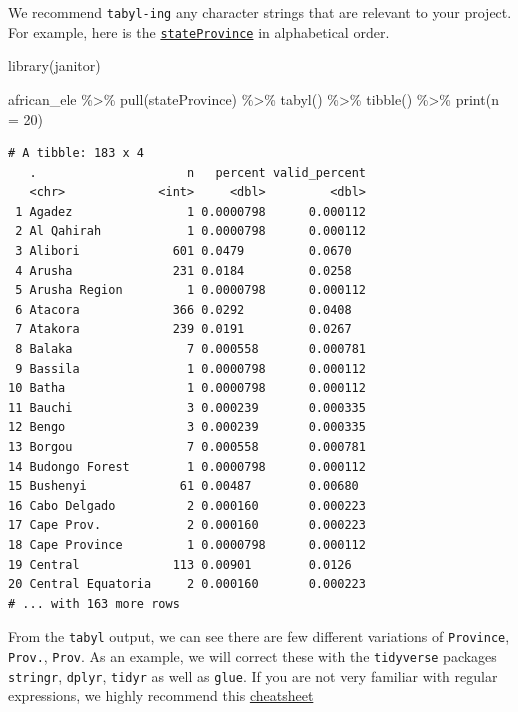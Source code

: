 \documentclass[
  letterpaper,
  DIV=11,
  numbers=noendperiod,
  oneside]{scrreprt}
\newenvironment{Shaded}{\begin{snugshade}}{\end{snugshade}}
\newcommand{\AttributeTok}[1]{\textcolor[rgb]{0.40,0.45,0.13}{#1}}
\newcommand{\DecValTok}[1]{\textcolor[rgb]{0.68,0.00,0.00}{#1}}
\newcommand{\FunctionTok}[1]{\textcolor[rgb]{0.28,0.35,0.67}{#1}}
\newcommand{\NormalTok}[1]{\textcolor[rgb]{0.00,0.23,0.31}{#1}}
\newcommand{\SpecialCharTok}[1]{\textcolor[rgb]{0.37,0.37,0.37}{#1}}
\begin{document}
We recommend \texttt{tabyl-ing} any character strings that are relevant
to your project. For example, here is the
\href{https://dwc.tdwg.org/terms/\#dwc:stateProvince}{\texttt{stateProvince}}
in alphabetical order.

\begin{Shaded}
\begin{Highlighting}[]
\FunctionTok{library}\NormalTok{(janitor)}

\NormalTok{african\_ele }\SpecialCharTok{\%\textgreater{}\%}
  \FunctionTok{pull}\NormalTok{(stateProvince) }\SpecialCharTok{\%\textgreater{}\%} 
  \FunctionTok{tabyl}\NormalTok{() }\SpecialCharTok{\%\textgreater{}\%} 
  \FunctionTok{tibble}\NormalTok{() }\SpecialCharTok{\%\textgreater{}\%} 
  \FunctionTok{print}\NormalTok{(}\AttributeTok{n =} \DecValTok{20}\NormalTok{)}
\end{Highlighting}
\end{Shaded}

\begin{verbatim}
# A tibble: 183 x 4
   .                     n   percent valid_percent
   <chr>             <int>     <dbl>         <dbl>
 1 Agadez                1 0.0000798      0.000112
 2 Al Qahirah            1 0.0000798      0.000112
 3 Alibori             601 0.0479         0.0670  
 4 Arusha              231 0.0184         0.0258  
 5 Arusha Region         1 0.0000798      0.000112
 6 Atacora             366 0.0292         0.0408  
 7 Atakora             239 0.0191         0.0267  
 8 Balaka                7 0.000558       0.000781
 9 Bassila               1 0.0000798      0.000112
10 Batha                 1 0.0000798      0.000112
11 Bauchi                3 0.000239       0.000335
12 Bengo                 3 0.000239       0.000335
13 Borgou                7 0.000558       0.000781
14 Budongo Forest        1 0.0000798      0.000112
15 Bushenyi             61 0.00487        0.00680 
16 Cabo Delgado          2 0.000160       0.000223
17 Cape Prov.            2 0.000160       0.000223
18 Cape Province         1 0.0000798      0.000112
19 Central             113 0.00901        0.0126  
20 Central Equatoria     2 0.000160       0.000223
# ... with 163 more rows
\end{verbatim}

From the \texttt{tabyl} output, we can see there are few different
variations of \texttt{Province}, \texttt{Prov.}, \texttt{Prov}. As an
example, we will correct these with the \texttt{tidyverse} packages
\texttt{stringr}, \texttt{dplyr}, \texttt{tidyr} as well as
\texttt{glue}. If you are not very familiar with regular expressions, we
highly recommend this
\href{https://evoldyn.gitlab.io/evomics-2018/ref-sheets/R_strings.pdf}{cheatsheet}
\end{document}
